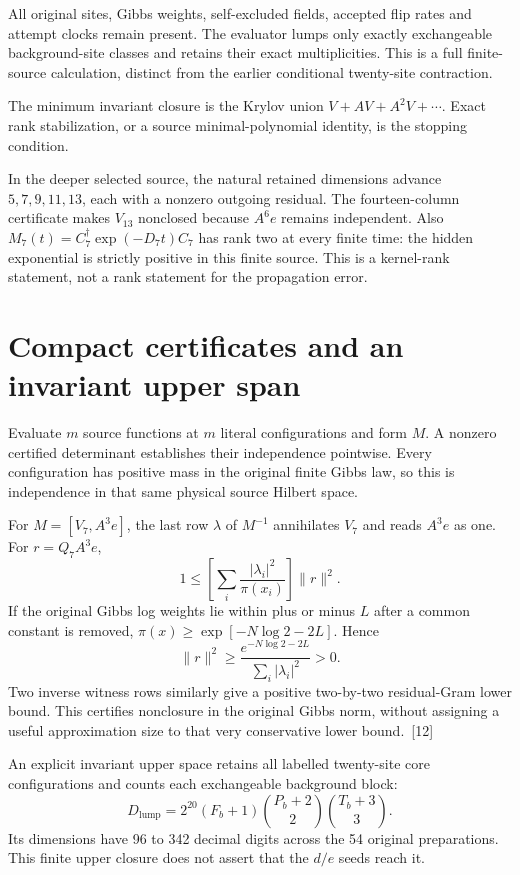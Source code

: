 \documentclass[10pt,twocolumn,letterpaper]{article}
\begin{document}
All original sites, Gibbs weights, self-excluded fields, accepted flip rates and attempt clocks remain present. The evaluator lumps only exactly exchangeable background-site classes and retains their exact multiplicities. This is a full finite-source calculation, distinct from the earlier conditional twenty-site contraction.

The minimum invariant closure is the Krylov union $V+AV+A^2V+\cdots$. Exact rank stabilization, or a source minimal-polynomial identity, is the stopping condition.

In the deeper selected source, the natural retained dimensions advance $5,7,9,11,13$, each with a nonzero outgoing residual. The fourteen-column certificate makes $V_{13}$ nonclosed because $A^6e$ remains independent. Also $M_7(t)=C_7^\dagger\exp(-D_7t)C_7$ has rank two at every finite time: the hidden exponential is strictly positive in this finite source. This is a kernel-rank statement, not a rank statement for the propagation error.

\section{Compact certificates and an invariant upper span}
Evaluate $m$ source functions at $m$ literal configurations and form $M$. A nonzero certified determinant establishes their independence pointwise. Every configuration has positive mass in the original finite Gibbs law, so this is independence in that same physical source Hilbert space.

For $M=[V_7,A^3e]$, the last row $\lambda$ of $M^{-1}$ annihilates $V_7$ and reads $A^3e$ as one. For $r=Q_7A^3e$,
\[
1\leq\left[\sum_i\frac{|\lambda_i|^2}{\pi(x_i)}\right]\|r\|^2.
\]
If the original Gibbs log weights lie within plus or minus $L$ after a common constant is removed, $\pi(x)\geq\exp[-N\log2-2L]$. Hence
\[
\|r\|^2\geq\frac{e^{-N\log2-2L}}{\sum_i|\lambda_i|^2}>0.
\]
Two inverse witness rows similarly give a positive two-by-two residual-Gram lower bound. This certifies nonclosure in the original Gibbs norm, without assigning a useful approximation size to that very conservative lower bound.~[12]

An explicit invariant upper space retains all labelled twenty-site core configurations and counts each exchangeable background block:
\[
D_{\mathrm{lump}}=2^{20}(F_b+1)\binom{P_b+2}{2}\binom{T_b+3}{3}.
\]
Its dimensions have 96 to 342 decimal digits across the 54 original preparations. This finite upper closure does not assert that the $d/e$ seeds reach it.
\end{document}
